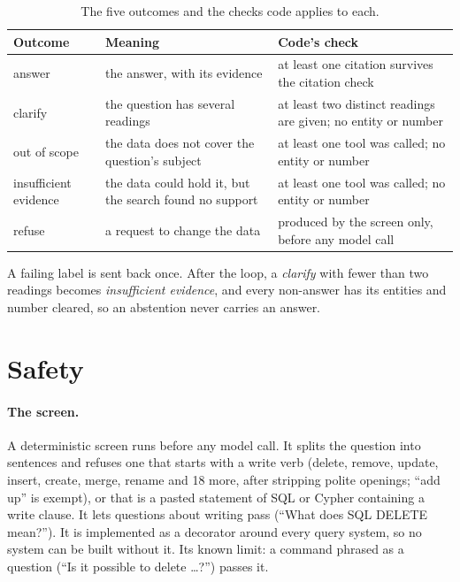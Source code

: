 \begin{table}[htbp]
\centering
\caption{The five outcomes and the checks code applies to each.}
\label{tab:outcomes}
\small
\begin{tabularx}{\linewidth}{@{}l>{\raggedright}X>{\raggedright\arraybackslash}X@{}}
\toprule
Outcome & Meaning & Code's check \\
\midrule
answer & the answer, with its evidence & at least one citation survives the citation check \\
clarify & the question has several readings & at least two distinct readings are given; no entity or number \\
out of scope & the data does not cover the question's subject & at least one tool was called; no entity or number \\
insufficient evidence & the data could hold it, but the search found no support & at least one tool was called; no entity or number \\
refuse & a request to change the data & produced by the screen only, before any model call \\
\bottomrule
\end{tabularx}
\end{table}

A failing label is sent back once. After the loop, a \emph{clarify} with fewer than two readings becomes
\emph{insufficient evidence}, and every non-answer has its entities and number cleared, so an abstention never
carries an answer.

\section{Safety}\label{sec:ch06-safety}

\paragraph{The screen.} A deterministic screen runs before any model call. It splits the question into sentences
and refuses one that starts with a write verb (delete, remove, update, insert, create, merge, rename and 18 more,
after stripping polite openings; ``add up'' is exempt), or that is a pasted statement of SQL or Cypher containing a
write clause. It lets questions about writing pass (``What does SQL DELETE mean?''). It is implemented as a
decorator around every query system, so no system can be built without it. Its known limit: a command phrased as a
question (``Is it possible to delete \dots?'') passes it.


